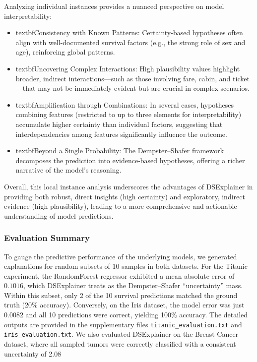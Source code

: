 \documentclass[acmlarge]{acmart}
\begin{document}
Analyzing individual instances provides a nuanced perspective on model interpretability:
\begin{itemize}
    \item textbf{Consistency with Known Patterns:} Certainty-based hypotheses often align with well-documented survival factors (e.g., the strong role of sex and age), reinforcing global patterns.
    \item textbf{Uncovering Complex Interactions:} High plausibility values highlight broader, indirect interactions—such as those involving fare, cabin, and ticket—that may not be immediately evident but are crucial in complex scenarios.
    \item textbf{Amplification through Combinations:} In several cases, hypotheses combining features (restricted to up to three elements for interpretability) accumulate higher certainty than individual factors, suggesting that interdependencies among features significantly influence the outcome.
    \item textbf{Beyond a Single Probability:} The Dempster–Shafer framework decomposes the prediction into evidence-based hypotheses, offering a richer narrative of the model’s reasoning.
\end{itemize}

Overall, this local instance analysis underscores the advantages of DSExplainer in providing both robust, direct insights (high certainty) and exploratory, indirect evidence (high plausibility), leading to a more comprehensive and actionable understanding of model predictions.
\subsubsection{Evaluation Summary}
\label{sec:validation}

To gauge the predictive performance of the underlying models, we generated explanations for random subsets of 10 samples in both datasets. For the Titanic experiment, the RandomForest regressor exhibited a mean absolute error of $0.1016$, which DSExplainer treats as the Dempster--Shafer ``uncertainty'' mass. Within this subset, only 2 of the 10 survival predictions matched the ground truth (20\% accuracy). Conversely, on the Iris dataset, the model error was just $0.0082$ and all 10 predictions were correct, yielding 100\% accuracy. The detailed outputs are provided in the supplementary files \texttt{titanic\_evaluation.txt} and \texttt{iris\_evaluation.txt}.
We also evaluated DSExplainer on the Breast Cancer dataset, where all sampled tumors were correctly classified with a consistent uncertainty of 2.08%
\end{document}
